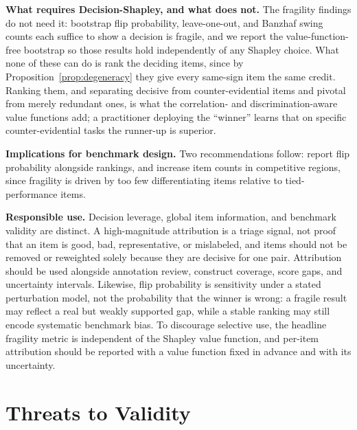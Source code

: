 \documentclass[conference]{IEEEtran}
\begin{document}
\textbf{What requires Decision-Shapley, and what does not.}
The fragility findings do not need it: bootstrap flip probability, leave-one-out, and Banzhaf swing counts each suffice to show a decision is fragile, and we report the value-function-free bootstrap so those results hold independently of any Shapley choice.
What none of these can do is rank the deciding items, since by Proposition~\ref{prop:degeneracy} they give every same-sign item the same credit.
Ranking them, and separating decisive from counter-evidential items and pivotal from merely redundant ones, is what the correlation- and discrimination-aware value functions add; a practitioner deploying the ``winner'' learns that on specific counter-evidential tasks the runner-up is superior.

\textbf{Implications for benchmark design.}
Two recommendations follow: report flip probability alongside rankings, and increase item counts in competitive regions, since fragility is driven by too few differentiating items relative to tied-performance items.

\textbf{Responsible use.}
Decision leverage, global item information, and benchmark validity are distinct.
A high-magnitude attribution is a triage signal, not proof that an item is good, bad, representative, or mislabeled, and items should not be removed or reweighted solely because they are decisive for one pair.
Attribution should be used alongside annotation review, construct coverage, score gaps, and uncertainty intervals.
Likewise, flip probability is sensitivity under a stated perturbation model, not the probability that the winner is wrong: a fragile result may reflect a real but weakly supported gap, while a stable ranking may still encode systematic benchmark bias.
To discourage selective use, the headline fragility metric is independent of the Shapley value function, and per-item attribution should be reported with a value function fixed in advance and with its uncertainty.

\section{Threats to Validity}
\label{sec:threats}
\end{document}

